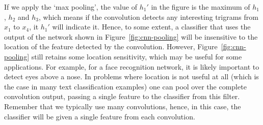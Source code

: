 If we apply the `max pooling',
the value of $h_{1}'$ in the figure is
the maximum of $h_{1}$, $h_{2}$ and $h_{3}$,
which means if the convolution detects any interesting trigrams
from $x_{1}$ to $x_{4}$, it $h_{1}'$ will indicate it.
Hence, to some extent, a classifier that uses
the output of the network shown in Figure~\ref{fig:cnn-pooling}
will be insensitive to the location of the feature detected by the convolution.
However, Figure~\ref{fig:cnn-pooling} still retains some location sensitivity,
which may be useful for some applications.
For example, for a face recognition network,
it is likely important to detect eyes above a nose.
In problems where location is not useful at all
(which is the case in many text classification examples)
one can pool over the complete convolution output,
passing a single feature to the classifier from this filter.%
Remember that we typically use many convolutions,
hence, in this case,
the classifier will be given a single feature from each convolution.

